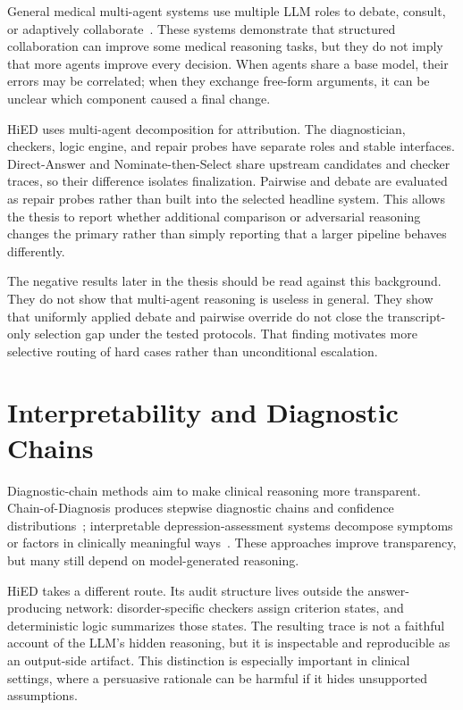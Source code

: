 General medical multi-agent systems use multiple LLM roles to debate, consult, or adaptively collaborate~\citep{tang2024medagents,kim2024mdagents}. These systems demonstrate that structured collaboration can improve some medical reasoning tasks, but they do not imply that more agents improve every decision. When agents share a base model, their errors may be correlated; when they exchange free-form arguments, it can be unclear which component caused a final change.

HiED uses multi-agent decomposition for attribution. The diagnostician, checkers, logic engine, and repair probes have separate roles and stable interfaces. Direct-Answer and Nominate-then-Select share upstream candidates and checker traces, so their difference isolates finalization. Pairwise and debate are evaluated as repair probes rather than built into the selected headline system. This allows the thesis to report whether additional comparison or adversarial reasoning changes the primary rather than simply reporting that a larger pipeline behaves differently.

The negative results later in the thesis should be read against this background. They do not show that multi-agent reasoning is useless in general. They show that uniformly applied debate and pairwise override do not close the transcript-only selection gap under the tested protocols. That finding motivates more selective routing of hard cases rather than unconditional escalation.

\section{Interpretability and Diagnostic Chains}

Diagnostic-chain methods aim to make clinical reasoning more transparent. Chain-of-Diagnosis produces stepwise diagnostic chains and confidence distributions~\citep{chen2025cod}; interpretable depression-assessment systems decompose symptoms or factors in clinically meaningful ways~\citep{lee2026interpretable,lyu2026depllm}. These approaches improve transparency, but many still depend on model-generated reasoning.

HiED takes a different route. Its audit structure lives outside the answer-producing network: disorder-specific checkers assign criterion states, and deterministic logic summarizes those states. The resulting trace is not a faithful account of the LLM's hidden reasoning, but it is inspectable and reproducible as an output-side artifact. This distinction is especially important in clinical settings, where a persuasive rationale can be harmful if it hides unsupported assumptions.

